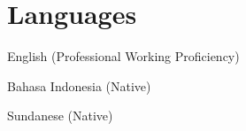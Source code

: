 \documentclass[a4paper, 11pt]{article}
\begin{document}
\section{Languages}
\begin{itemize}[leftmargin=0.22in]
    \small{\item{English (Professional Working Proficiency)}}
    \small{\item{Bahasa Indonesia (Native)}}
    \small{\item{Sundanese (Native)}}
\end{itemize}
\end{document}
